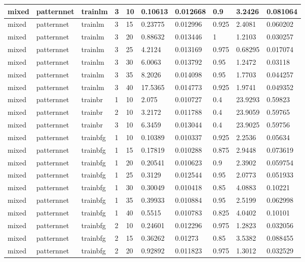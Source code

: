 \begin{longtable}{lllllllll}
mixed & patternnet & trainlm & 3 & 10 & 0.10613 & 0.012668 & 0.9 & 3.2426 & 0.081064 \\ \hline 
mixed & patternnet & trainlm & 3 & 15 & 0.23775 & 0.012996 & 0.925 & 2.4081 & 0.060202 \\ \hline 
mixed & patternnet & trainlm & 3 & 20 & 0.88632 & 0.013446 & 1 & 1.2103 & 0.030257 \\ \hline 
mixed & patternnet & trainlm & 3 & 25 & 4.2124 & 0.013169 & 0.975 & 0.68295 & 0.017074 \\ \hline 
mixed & patternnet & trainlm & 3 & 30 & 6.0063 & 0.013792 & 0.95 & 1.2472 & 0.03118 \\ \hline 
mixed & patternnet & trainlm & 3 & 35 & 8.2026 & 0.014098 & 0.95 & 1.7703 & 0.044257 \\ \hline 
mixed & patternnet & trainlm & 3 & 40 & 17.5365 & 0.014773 & 0.925 & 1.9741 & 0.049352 \\ \hline 
mixed & patternnet & trainbr & 1 & 10 & 2.075 & 0.010727 & 0.4 & 23.9293 & 0.59823 \\ \hline 
mixed & patternnet & trainbr & 2 & 10 & 3.2172 & 0.011788 & 0.4 & 23.9059 & 0.59765 \\ \hline 
mixed & patternnet & trainbr & 3 & 10 & 6.3459 & 0.013044 & 0.4 & 23.9025 & 0.59756 \\ \hline 
mixed & patternnet & trainbfg & 1 & 10 & 0.10389 & 0.010337 & 0.925 & 2.2536 & 0.05634 \\ \hline 
mixed & patternnet & trainbfg & 1 & 15 & 0.17819 & 0.010288 & 0.875 & 2.9448 & 0.073619 \\ \hline 
mixed & patternnet & trainbfg & 1 & 20 & 0.20541 & 0.010623 & 0.9 & 2.3902 & 0.059754 \\ \hline 
mixed & patternnet & trainbfg & 1 & 25 & 0.3129 & 0.012544 & 0.95 & 2.0773 & 0.051933 \\ \hline 
mixed & patternnet & trainbfg & 1 & 30 & 0.30049 & 0.010418 & 0.85 & 4.0883 & 0.10221 \\ \hline 
mixed & patternnet & trainbfg & 1 & 35 & 0.39933 & 0.010884 & 0.95 & 2.5199 & 0.062998 \\ \hline 
mixed & patternnet & trainbfg & 1 & 40 & 0.5515 & 0.010783 & 0.825 & 4.0402 & 0.10101 \\ \hline 
mixed & patternnet & trainbfg & 2 & 10 & 0.24601 & 0.012296 & 0.975 & 1.2823 & 0.032056 \\ \hline 
mixed & patternnet & trainbfg & 2 & 15 & 0.36262 & 0.01273 & 0.85 & 3.5382 & 0.088455 \\ \hline 
mixed & patternnet & trainbfg & 2 & 20 & 0.92892 & 0.011823 & 0.975 & 1.3012 & 0.032529 \\ \hline 

\end{longtable}
